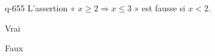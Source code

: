 \begin{truefalse}{q-655}
L'assertion « $x\geq 2 \Rightarrow x \leq 3$ » est fausse si $x<2$.
\item Vrai
\item* Faux
\end{truefalse}


